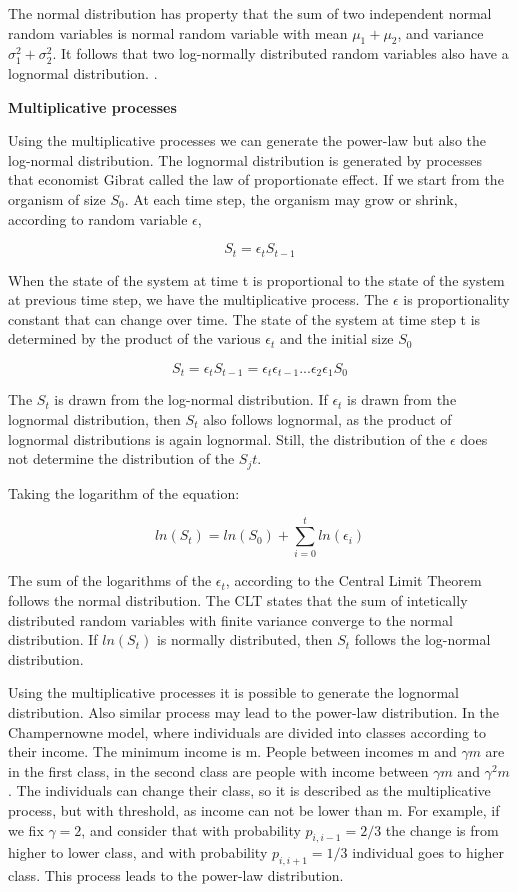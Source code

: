 The normal distribution has property that the sum of two independent normal random variables is normal random variable with mean $\mu_1+\mu_2$, and variance $\sigma_1^2+ \sigma_2^2$. It follows that two log-normally distributed random variables also have a lognormal distribution. \cite{mitzenmacher2004brief}. 

\textbf{Multiplicative processes}

Using the multiplicative processes we can generate the power-law but also the log-normal distribution. The lognormal distribution is generated by processes that economist Gibrat called the law of proportionate effect. If we start from the organism of size $S_0$. At each time step, the organism may grow or shrink,  according to random variable $\epsilon$, 

$$S_t = \epsilon_t S_{t-1}$$   

When the state of the system at time t is proportional to the state of the system at previous time step, we have the multiplicative process. The $\epsilon$ is proportionality constant that can change over time. The state of the system at time step t is determined by the product of the various $\epsilon_t$ and the initial size $S_0$ 

$$S_t = \epsilon_t S_{t-1} = \epsilon_t \epsilon_{t-1}... \epsilon_2 \epsilon_1 S_{0} $$

The $S_t$ is drawn from the log-normal distribution. If $\epsilon_t$ is drawn from the lognormal distribution, then $S_t$ also follows lognormal, as the product of lognormal distributions is again lognormal. Still, the distribution of the $\epsilon$ does not determine the distribution of the $S_jt$. 

Taking the logarithm of the equation:

$$ln(S_t) = ln(S_0) + \sum_{i=0}^{t} ln(\epsilon_i)$$

The sum of the logarithms of the $\epsilon_t$, according to the Central Limit Theorem follows the normal distribution. The CLT states that the sum of intetically distributed random variables with finite variance converge to the normal distribution. If $ln(S_t)$ is normally distributed, then $S_t$ follows the log-normal distribution.   

Using the multiplicative processes it is possible to generate the lognormal distribution. Also similar process may lead to the power-law distribution. In the Champernowne model, where individuals are divided into classes according to their income. The minimum income is m. People between incomes m and $\gamma m$ are in the first class, in the second class are people with income between $\gamma m$ and $\gamma^2 m $. The individuals can change their class, so it is described as the multiplicative process, but with threshold, as income can not be lower than m. For example, if we fix $\gamma=2$, and consider that with probability $p_{i,i-1}=2/3$ the change is from higher to lower class, and with probability $p_{i, i+1}=1/3$ individual goes to higher class. This process leads to the power-law distribution.


